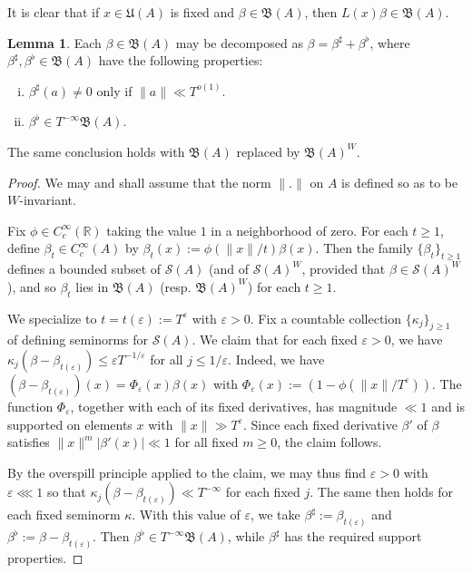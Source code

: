 \documentclass[reqno]{amsart}
\def\eps{\varepsilon}
\theoremstyle{plain} \newtheorem{theorem} {Theorem}
\theoremstyle{definition} \newtheorem{definition} [theorem] {Definition}
\theoremstyle{itplain} %
\newtheorem{lemma}[theorem]{Lemma}
\numberwithin{equation}{section}
\numberwithin{theorem}{section}
\renewcommand{\geq}{\geqslant}
\renewcommand{\leq}{\leqslant}
\begin{document}
It is clear that if $x \in \mathfrak{U}(A)$ is fixed and $\beta \in \mathfrak{B}(A)$, then $L(x) \beta \in \mathfrak{B}(A)$.

\begin{lemma}\label{lem:standard:each-beta-in}
  Each $\beta \in \mathfrak{B}(A)$ may be decomposed as $\beta = \beta ^\sharp + \beta ^\flat$, where $\beta ^\sharp, \beta ^\flat \in \mathfrak{B}(A)$ have the following properties:
  \begin{enumerate}[(i)]
  \item $\beta ^\sharp(a) \neq 0$ only if $\|a\| \ll T^{o(1)}$.
  \item $\beta ^\flat \in T^{-\infty} \mathfrak{B}(A)$.
  \end{enumerate}
  The same conclusion holds with $\mathfrak{B}(A)$ replaced by $\mathfrak{B}(A)^W$.
\end{lemma}
\begin{proof}
  We may and shall assume that the norm $\|.\|$ on $A$ is defined so as to be $W$-invariant.
  
  Fix $\phi \in C_c^\infty(\mathbb{R})$ taking the value $1$ in a neighborhood of zero.  For each $t \geq 1$, define $\beta_t \in C_c^\infty(A)$ by $\beta_t(x) := \phi(\|x\|/t) \beta(x)$.  Then the family $\{\beta_t\}_{t \geq 1}$ defines a bounded subset of $\mathcal{S}(A)$ (and of $\mathcal{S}(A)^W$, provided that $\beta \in \mathcal{S}(A)^W$), and so $\beta_t$ lies in $\mathfrak{B}(A)$ (resp. $\mathfrak{B}(A)^W$) for each $t \geq 1$.

  We specialize to $t = t(\eps) := T^{\eps}$ with $\eps > 0$.  Fix a countable collection $\{\kappa_j\}_{j \geq 1}$ of defining seminorms for $\mathcal{S}(A)$.  We claim that for each fixed $\eps > 0$, we have $\kappa_j(\beta - \beta_{t(\eps)}) \leq \eps T^{-1/\eps}$ for all $j \leq 1/\eps$.  Indeed, we have $(\beta - \beta_{t(\eps)})(x) = \Phi_\eps(x) \beta(x)$ with $\Phi_\eps(x) := (1 - \phi(\|x\| / T^\eps))$.  The function $\Phi_\eps$, together with each of its fixed derivatives, has magnitude $\ll 1$ and is supported on elements $x$ with $\|x\| \gg T^{\eps}$.  Since each fixed derivative $\beta '$ of $\beta$ satisfies $\|x\|^m |\beta '(x)| \ll 1$ for all fixed $m \geq 0$, the claim follows.

  By the overspill principle applied to the claim, we may thus find $\eps > 0$ with $\eps \lll 1$ so that $\kappa_j(\beta - \beta_{t(\eps)}) \ll T^{-\infty}$ for each fixed $j$.  The same then holds for each fixed seminorm $\kappa$.  With this value of $\eps$, we take $\beta ^\sharp := \beta_{t(\eps)}$ and $\beta ^\flat := \beta - \beta_{t(\eps)}$.  Then $\beta ^\flat \in T^{-\infty} \mathfrak{B}(A)$, while $\beta ^\sharp$ has the required support properties.
\end{proof}
\end{document}
